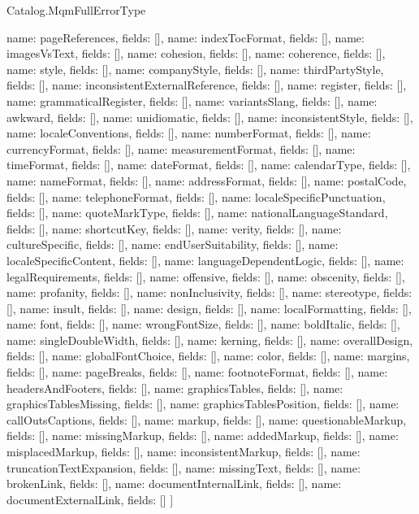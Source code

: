 \begin{lexlean}{Catalog.MqmFullErrorType}
\begin{semanticmodule}
{    {name: pageReferences, fields: []},
    {name: indexTocFormat, fields: []},
    {name: imagesVsText, fields: []},
    {name: cohesion, fields: []},
    {name: coherence, fields: []},
    {name: style, fields: []},
    {name: companyStyle, fields: []},
    {name: thirdPartyStyle, fields: []},
    {name: inconsistentExternalReference, fields: []},
    {name: register, fields: []},
    {name: grammaticalRegister, fields: []},
    {name: variantsSlang, fields: []},
    {name: awkward, fields: []},
    {name: unidiomatic, fields: []},
    {name: inconsistentStyle, fields: []},
    {name: localeConventions, fields: []},
    {name: numberFormat, fields: []},
    {name: currencyFormat, fields: []},
    {name: measurementFormat, fields: []},
    {name: timeFormat, fields: []},
    {name: dateFormat, fields: []},
    {name: calendarType, fields: []},
    {name: nameFormat, fields: []},
    {name: addressFormat, fields: []},
    {name: postalCode, fields: []},
    {name: telephoneFormat, fields: []},
    {name: localeSpecificPunctuation, fields: []},
    {name: quoteMarkType, fields: []},
    {name: nationalLanguageStandard, fields: []},
    {name: shortcutKey, fields: []},
    {name: verity, fields: []},
    {name: cultureSpecific, fields: []},
    {name: endUserSuitability, fields: []},
    {name: localeSpecificContent, fields: []},
    {name: languageDependentLogic, fields: []},
    {name: legalRequirements, fields: []},
    {name: offensive, fields: []},
    {name: obscenity, fields: []},
    {name: profanity, fields: []},
    {name: nonInclusivity, fields: []},
    {name: stereotype, fields: []},
    {name: insult, fields: []},
    {name: design, fields: []},
    {name: localFormatting, fields: []},
    {name: font, fields: []},
    {name: wrongFontSize, fields: []},
    {name: boldItalic, fields: []},
    {name: singleDoubleWidth, fields: []},
    {name: kerning, fields: []},
    {name: overallDesign, fields: []},
    {name: globalFontChoice, fields: []},
    {name: color, fields: []},
    {name: margins, fields: []},
    {name: pageBreaks, fields: []},
    {name: footnoteFormat, fields: []},
    {name: headersAndFooters, fields: []},
    {name: graphicsTables, fields: []},
    {name: graphicsTablesMissing, fields: []},
    {name: graphicsTablesPosition, fields: []},
    {name: callOutsCaptions, fields: []},
    {name: markup, fields: []},
    {name: questionableMarkup, fields: []},
    {name: missingMarkup, fields: []},
    {name: addedMarkup, fields: []},
    {name: misplacedMarkup, fields: []},
    {name: inconsistentMarkup, fields: []},
    {name: truncationTextExpansion, fields: []},
    {name: missingText, fields: []},
    {name: brokenLink, fields: []},
    {name: documentInternalLink, fields: []},
    {name: documentExternalLink, fields: []}
  ]
}
\end{semanticmodule}
\end{lexlean}
